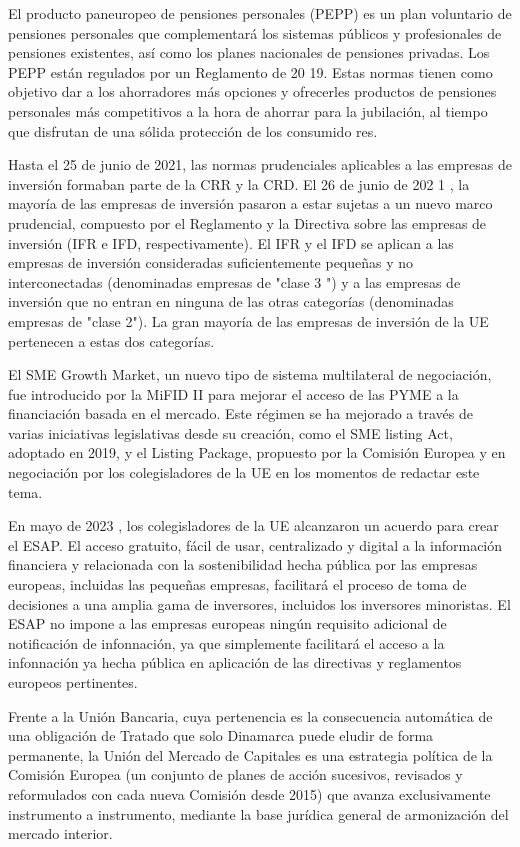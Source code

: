 \documentclass[10pt,a4paper]{article}
\begin{document}
{{    El producto paneuropeo de pensiones personales (PEPP) es un plan voluntario de pensiones personales que complementará los sistemas públicos y profesionales de pensiones existentes, así como los planes nacionales de pensiones privadas. Los PEPP están regulados por un Reglamento de 20 19. Estas normas tienen como objetivo dar a los ahorradores más opciones y ofrecerles productos de pensiones personales más competitivos a la hora de ahorrar para la jubilación, al tiempo que disfrutan de una sólida protección de los consumido res. 
    
    Hasta el 25 de junio de 2021, las normas prudenciales aplicables a las empresas de inversión formaban parte de la CRR y la CRD. El 26 de junio de 202 1 , la mayoría de las empresas de inversión pasaron a estar sujetas a un nuevo marco prudencial, compuesto por el Reglamento y la Directiva sobre las empresas de inversión (IFR e IFD, respectivamente). El IFR y el IFD se aplican a las empresas de inversión consideradas suficientemente pequeñas y no interconectadas (denominadas empresas de "clase 3 ") y a las empresas de inversión que no entran en ninguna de las otras categorías (denominadas empresas de "clase 2"). La gran mayoría de las empresas de inversión de la UE pertenecen a estas dos categorías. 
    
    El SME Growth Market, un nuevo tipo de sistema multilateral de negociación, fue introducido por la MiFID II para mejorar el acceso de las PYME a la financiación basada en el mercado. Este régimen se ha mejorado a través de varias iniciativas legislativas desde su creación, como el SME listing Act, adoptado en 2019, y el Listing Package, propuesto por la Comisión Europea y en negociación por los colegisladores de la UE en los momentos de redactar este tema. 
    
    En mayo de 2023 , los colegisladores de la UE alcanzaron un acuerdo para crear el ESAP. El acceso gratuito, fácil de usar, centralizado y digital a la información financiera y relacionada con la sostenibilidad hecha pública por las empresas europeas, incluidas las pequeñas empresas, facilitará el proceso de toma de decisiones a una amplia gama de inversores, incluidos los inversores minoristas. El ESAP no impone a las empresas europeas ningún requisito adicional de notificación de infonnación, ya que simplemente facilitará el acceso a la infonnación ya hecha pública en aplicación de las directivas y reglamentos europeos pertinentes.
}

Frente a la Unión Bancaria, cuya pertenencia es la consecuencia automática de una obligación de Tratado que solo Dinamarca puede eludir de forma permanente, la Unión del Mercado de Capitales es una estrategia política de la Comisión Europea (un conjunto de planes de acción sucesivos, revisados y reformulados con cada nueva Comisión desde 2015) que avanza exclusivamente instrumento a instrumento, mediante la base jurídica general de armonización del mercado interior. 

}
\end{document}
